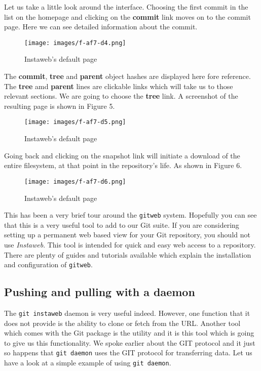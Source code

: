 Let us take a little look around the interface.
Choosing the first commit in the list on the homepage and clicking on the \textbf{commit} link moves on to the commit page.
Here we can see detailed information about the commit.

\begin{figure}[hbt]
\centering
\texttt{[image: images/f-af7-d4.png]}
\caption{Instaweb's default page}
\end{figure}

The \textbf{commit}, \textbf{tree} and \textbf{parent} object hashes are displayed here fore reference.
The \textbf{tree} amd \textbf{parent} lines are clickable links which will take us to those relevant sections.
We are going to choose the \textbf{tree} link.
A screenshot of the resulting page is shown in Figure 5.

\begin{figure}[hbt]
\centering
\texttt{[image: images/f-af7-d5.png]}
\caption{Instaweb's default page}
\end{figure}

Going back and clicking on the snapshot link will initiate a download of the entire filesystem, at that point in the repository's life.
As shown in Figure 6.

\begin{figure}[hbt]
\centering
\texttt{[image: images/f-af7-d6.png]}
\caption{Instaweb's default page}
\end{figure}

This has been a very brief tour around the \texttt{gitweb} system.
Hopefully you can see that this is a very useful tool to add to our Git suite.
If you are considering setting up a permanent web based view for your Git repository, you should not use \emph{Instaweb}.
This tool is intended for quick and easy web access to a repository.
There are plenty of guides and tutorials available which explain the installation and configuration of \texttt{gitweb}.

\subsection{Pushing and pulling with a daemon}
The \texttt{git instaweb} daemon is very useful indeed.
However, one function that it does not provide is the ability to clone or fetch from the URL.
Another tool which comes with the Git package is the  utility and it is this tool which is going to give us this functionality.
We spoke earlier about the GIT protocol and it just so happens that \texttt{git daemon} uses the GIT protocol for transferring data.
Let us have a look at a simple example of using \texttt{git daemon}.

